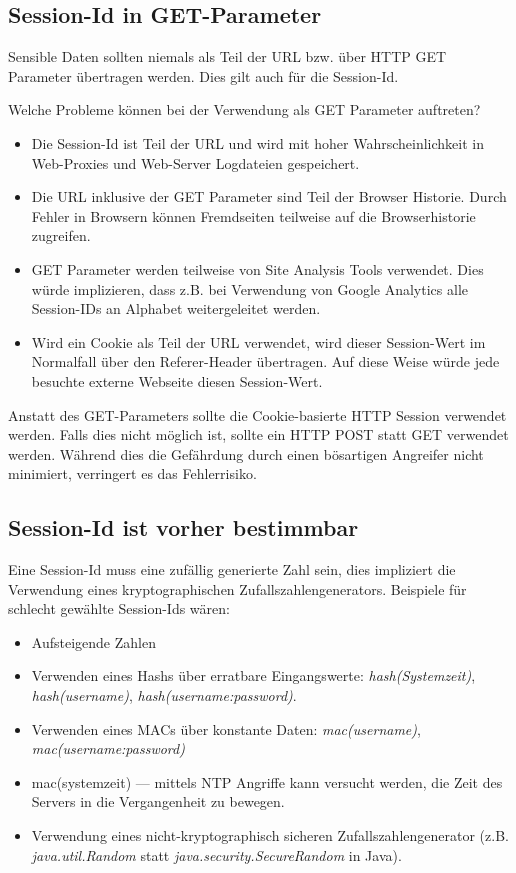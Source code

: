 \subsection{Session-Id in GET-Parameter}

Sensible Daten sollten niemals als Teil der URL bzw. über HTTP GET Parameter übertragen werden. Dies gilt auch für die Session-Id.

Welche Probleme können bei der Verwendung als GET Parameter auftreten?

\begin{itemize}
	\item Die Session-Id ist Teil der URL und wird mit hoher Wahrscheinlichkeit in Web-Proxies und Web-Server Logdateien gespeichert.
	\item Die URL inklusive der GET Parameter sind Teil der Browser Historie. Durch Fehler in Browsern können Fremdseiten teilweise auf die Browserhistorie zugreifen.
	\item GET Parameter werden teilweise von Site Analysis Tools verwendet. Dies würde implizieren, dass z.B. bei Verwendung von Google Analytics alle Session-IDs an Alphabet weitergeleitet werden.
	\item Wird ein Cookie als Teil der URL verwendet, wird dieser Session-Wert im Normalfall über den Referer-Header übertragen. Auf diese Weise würde jede besuchte externe Webseite diesen Session-Wert.
\end{itemize}

Anstatt des GET-Parameters sollte die Cookie-basierte HTTP Session verwendet werden. Falls dies nicht möglich ist, sollte ein HTTP POST statt GET verwendet werden. Während dies die Gefährdung durch einen bösartigen Angreifer nicht minimiert, verringert es das Fehlerrisiko.

\subsection{Session-Id ist vorher bestimmbar}

Eine Session-Id muss eine zufällig generierte Zahl sein, dies impliziert die Verwendung eines kryptographischen Zufallszahlengenerators. Beispiele für schlecht gewählte Session-Ids wären:

\begin{itemize}
	\item Aufsteigende Zahlen
	\item Verwenden eines Hashs über erratbare Eingangswerte: \textit{hash(Systemzeit)}, \textit{hash(username)}, \textit{hash(username:password)}.
	\item Verwenden eines MACs über konstante Daten: \textit{mac(username)}, \textit{mac(username:password)}
	\item mac(systemzeit) --- mittels NTP Angriffe kann versucht werden, die Zeit des Servers in die Vergangenheit zu bewegen.
	\item Verwendung eines nicht-kryptographisch sicheren Zufallszahlengenerator (z.B. \textit{java.util.Random} statt \textit{java.security.SecureRandom} in Java).
\end{itemize}

